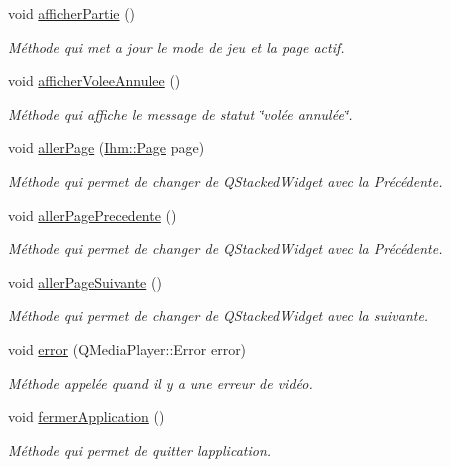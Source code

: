 \begin{DoxyCompactItemize}
void \hyperlink{class_ihm_a3b26fb5299eba99925d005ea39eef9da}{afficher\+Partie} ()
\begin{DoxyCompactList}\small\item\em Méthode qui met a jour le mode de jeu et la page actif. \end{DoxyCompactList}\item 
void \hyperlink{class_ihm_a066192d0a1b9c241a67032b0c3c96be6}{afficher\+Volee\+Annulee} ()
\begin{DoxyCompactList}\small\item\em Méthode qui affiche le message de statut \char`\"{}volée annulée\char`\"{}. \end{DoxyCompactList}\item 
void \hyperlink{class_ihm_a52bf0bd258d00a16d3e1037a9288948b}{aller\+Page} (\hyperlink{class_ihm_a472c7a7bec7e6e0230842f78ace4833e}{Ihm\+::\+Page} page)
\begin{DoxyCompactList}\small\item\em Méthode qui permet de changer de Q\+Stacked\+Widget avec la Précédente. \end{DoxyCompactList}\item 
void \hyperlink{class_ihm_ac63f9c49fbde4482bb28e7f7e5882b25}{aller\+Page\+Precedente} ()
\begin{DoxyCompactList}\small\item\em Méthode qui permet de changer de Q\+Stacked\+Widget avec la Précédente. \end{DoxyCompactList}\item 
void \hyperlink{class_ihm_a3c53027b16e9ed5f669b9865b2057e6a}{aller\+Page\+Suivante} ()
\begin{DoxyCompactList}\small\item\em Méthode qui permet de changer de Q\+Stacked\+Widget avec la suivante. \end{DoxyCompactList}\item 
void \hyperlink{class_ihm_a28b5dd043c4d752bb944110d8d8457aa}{error} (Q\+Media\+Player\+::\+Error error)
\begin{DoxyCompactList}\small\item\em Méthode appelée quand il y a une erreur de vidéo. \end{DoxyCompactList}\item 
void \hyperlink{class_ihm_a703fa568eb3a2fb7f912decad222817e}{fermer\+Application} ()
\begin{DoxyCompactList}\small\item\em Méthode qui permet de quitter l\textquotesingle{}application. \end{DoxyCompactList}\item 

\end{DoxyCompactItemize}
